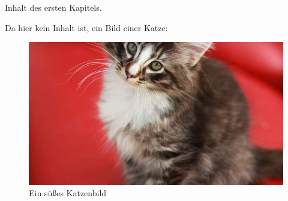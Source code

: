 \documentclass[../main.tex]{subfiles}
\begin{document}
Inhalt des ersten Kapitels.

Da hier kein Inhalt ist, ein Bild einer Katze:
\begin{figure}[H]
	\centering
	\includegraphics[width=\textwidth]{images/cat.jpg}
	\caption{Ein süßes Katzenbild}
	\label{fig:img_cat}
\end{figure}
\end{document}

